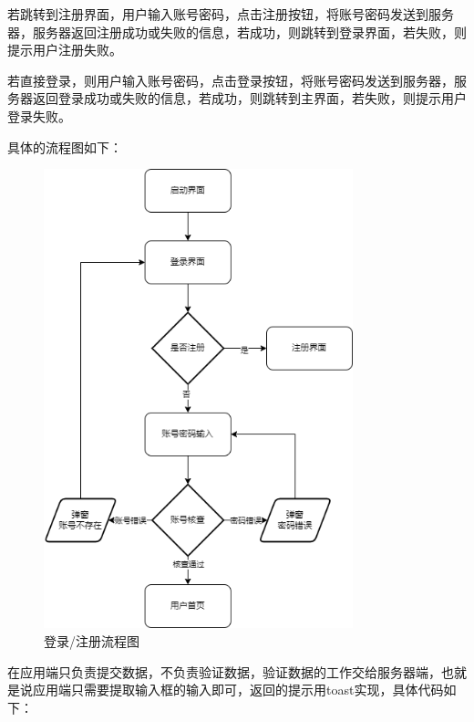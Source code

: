 \documentclass[UTF8,12pt]{article}
\begin{document}
若跳转到注册界面，用户输入账号密码，点击注册按钮，将账号密码发送到服务器，服务器返回注册成功或失败的信息，若成功，则跳转到登录界面，若失败，则提示用户注册失败。

若直接登录，则用户输入账号密码，点击登录按钮，将账号密码发送到服务器，服务器返回登录成功或失败的信息，若成功，则跳转到主界面，若失败，则提示用户登录失败。

具体的流程图如下：

\begin{figure}[htbp]
    \centering
    \includegraphics[width=0.8\textwidth]{imgs/14.png}
    \caption{登录/注册流程图}
\end{figure}

\newpage

在应用端只负责提交数据，不负责验证数据，验证数据的工作交给服务器端，也就是说应用端只需要提取输入框的输入即可，返回的提示用toast实现，具体代码如下：
\end{document}
